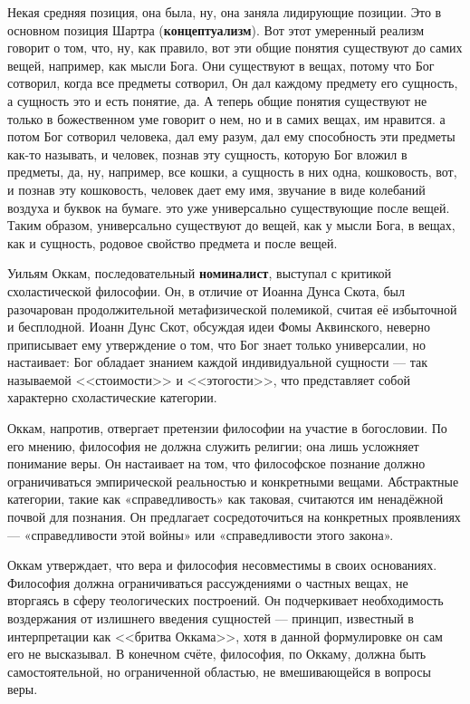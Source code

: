 Некая средняя позиция, она была, ну, она заняла лидирующие позиции. Это
в основном позиция Шартра (\textbf{концептуализм}). Вот этот
умеренный реализм говорит о том, что, ну, как правило, вот эти общие понятия
существуют до самих вещей, например, как мысли Бога. Они существуют в вещах,
потому что Бог сотворил, когда все предметы сотворил, Он дал каждому предмету
его сущность, а сущность это и есть понятие, да. А теперь общие понятия
существуют не только в божественном уме говорит о нем, но и в самих вещах, им
нравится. а потом Бог сотворил человека, дал ему разум, дал ему способность эти
предметы как-то называть, и человек, познав эту сущность, которую Бог вложил в
предметы, да, ну, например, все кошки, а сущность в них одна, кошковость, вот, и
познав эту кошковость, человек дает ему имя, звучание в виде колебаний воздуха и
буквок на бумаге. это уже универсально существующие после вещей. Таким образом,
универсально существуют до вещей, как у мысли Бога, в вещах, как и сущность,
родовое свойство предмета и после вещей. 

Уильям Оккам, последовательный \textbf{номиналист}, выступал с критикой схоластической философии. Он, в отличие от Иоанна Дунса Скота, был разочарован продолжительной метафизической полемикой, считая её избыточной и бесплодной. Иоанн Дунс Скот, обсуждая идеи Фомы Аквинского, неверно приписывает ему утверждение о том, что Бог знает только универсалии, но настаивает: Бог обладает знанием каждой индивидуальной сущности --- так называемой <<стоимости>> и <<этогости>>, что представляет собой характерно схоластические категории.

Оккам, напротив, отвергает претензии философии на участие в богословии. По его мнению, философия не должна служить религии; она лишь усложняет понимание веры. Он настаивает на том, что философское познание должно ограничиваться эмпирической реальностью и конкретными вещами. Абстрактные категории, такие как «справедливость» как таковая, считаются им ненадёжной почвой для познания. Он предлагает сосредоточиться на конкретных проявлениях --- «справедливости этой войны» или «справедливости этого закона».

Оккам утверждает, что вера и философия несовместимы в своих основаниях. Философия должна ограничиваться рассуждениями о частных вещах, не вторгаясь в сферу теологических построений. Он подчеркивает необходимость воздержания от излишнего введения сущностей --- принцип, известный в интерпретации как <<бритва Оккама>>, хотя в данной формулировке он сам его не высказывал. В конечном счёте, философия, по Оккаму, должна быть самостоятельной, но ограниченной областью, не вмешивающейся в вопросы веры.

